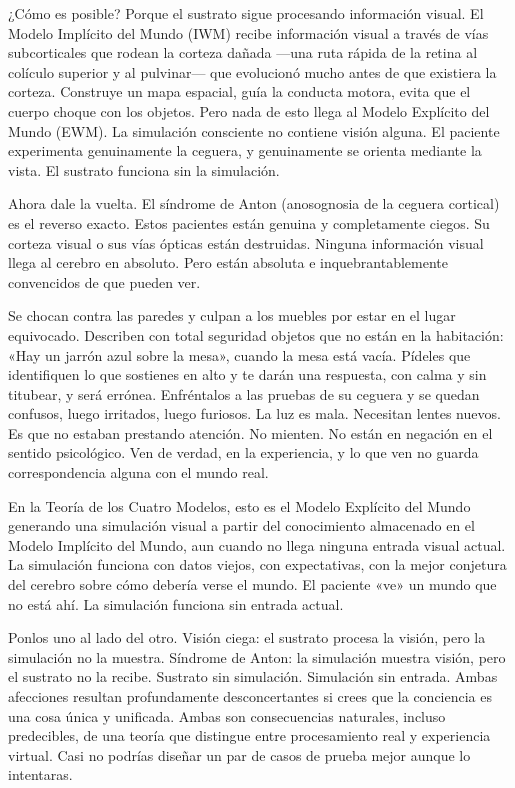 \documentclass[11pt, twoside, openright]{book}
\begin{document}
¿Cómo es posible? Porque el sustrato sigue procesando información visual. El Modelo Implícito del Mundo (IWM) recibe información visual a través de vías subcorticales que rodean la corteza dañada ---una ruta rápida de la retina al colículo superior y al pulvinar--- que evolucionó mucho antes de que existiera la corteza. Construye un mapa espacial, guía la conducta motora, evita que el cuerpo choque con los objetos. Pero nada de esto llega al Modelo Explícito del Mundo (EWM). La simulación consciente no contiene visión alguna. El paciente experimenta genuinamente la ceguera, y genuinamente se orienta mediante la vista. El sustrato funciona sin la simulación.

Ahora dale la vuelta. El síndrome de Anton (anosognosia de la ceguera cortical) es el reverso exacto. Estos pacientes están genuina y completamente ciegos. Su corteza visual o sus vías ópticas están destruidas. Ninguna información visual llega al cerebro en absoluto. Pero están absoluta e inquebrantablemente convencidos de que pueden ver.

Se chocan contra las paredes y culpan a los muebles por estar en el lugar equivocado. Describen con total seguridad objetos que no están en la habitación: «Hay un jarrón azul sobre la mesa», cuando la mesa está vacía. Pídeles que identifiquen lo que sostienes en alto y te darán una respuesta, con calma y sin titubear, y será errónea. Enfréntalos a las pruebas de su ceguera y se quedan confusos, luego irritados, luego furiosos. La luz es mala. Necesitan lentes nuevos. Es que no estaban prestando atención. No mienten. No están en negación en el sentido psicológico. Ven de verdad, en la experiencia, y lo que ven no guarda correspondencia alguna con el mundo real.

En la Teoría de los Cuatro Modelos, esto es el Modelo Explícito del Mundo generando una simulación visual a partir del conocimiento almacenado en el Modelo Implícito del Mundo, aun cuando no llega ninguna entrada visual actual. La simulación funciona con datos viejos, con expectativas, con la mejor conjetura del cerebro sobre cómo debería verse el mundo. El paciente «ve» un mundo que no está ahí. La simulación funciona sin entrada actual.

Ponlos uno al lado del otro. Visión ciega: el sustrato procesa la visión, pero la simulación no la muestra. Síndrome de Anton: la simulación muestra visión, pero el sustrato no la recibe. Sustrato sin simulación. Simulación sin entrada. Ambas afecciones resultan profundamente desconcertantes si crees que la conciencia es una cosa única y unificada. Ambas son consecuencias naturales, incluso predecibles, de una teoría que distingue entre procesamiento real y experiencia virtual. Casi no podrías diseñar un par de casos de prueba mejor aunque lo intentaras.
\end{document}
